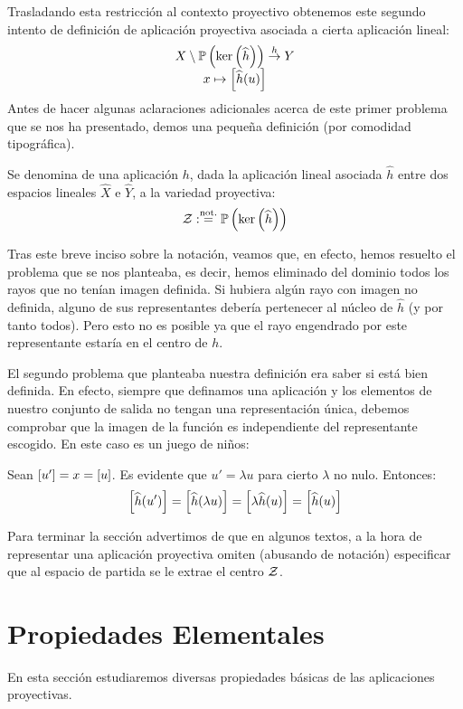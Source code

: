 Trasladando esta restricción al contexto proyectivo obtenemos este segundo intento de definición de aplicación proyectiva asociada a cierta aplicación lineal:
\[\begin{array}{c}
X\setminus\mathbb{P}\left(\ker\left(\widehat{h}\right)\right)\stackrel{h}{\to}Y\\
x\mapsto\left [ \widehat{h}(u) \right ]
\end{array}\]
Antes de hacer algunas aclaraciones adicionales acerca de este primer problema que se nos ha presentado, demos una pequeña definición (por comodidad tipográfica).
\begin{defi}[Centro]
	\label{C4_def_centro}
	Se denomina  de una aplicación $h$, dada la aplicación lineal asociada $\widehat{h}$ entre dos espacios lineales $\widehat{X}$ e $\widehat{Y}$, a la variedad proyectiva:
	\[\mathcal{Z}:\stackrel{\textrm{not.}}{=}\mathbb{P}\left(\ker\left(\widehat{h}\right)\right)\]
\end{defi}
Tras este breve inciso sobre la notación, veamos que, en efecto, hemos resuelto el problema que se nos planteaba, es decir, hemos eliminado del dominio todos los rayos que no tenían imagen definida. Si hubiera algún rayo con imagen no definida, alguno de sus representantes debería pertenecer al núcleo de $\widehat{h}$ (y por tanto todos). Pero esto no es posible ya que el rayo engendrado por este representante estaría en el centro de $h$.

El segundo problema que planteaba nuestra definición era saber si está bien definida. En efecto, siempre que definamos una aplicación y los elementos de nuestro conjunto de salida no tengan una representación única, debemos comprobar que la imagen de la función es independiente del representante escogido. En este caso es un juego de niños:

Sean $\left [ u' \right ]=x=\left [ u \right ]$. Es evidente que $u' = \lambda u$ para cierto $\lambda$ no nulo. Entonces:
\[\left [ \widehat{h}(u') \right ]=\left [ \widehat{h}(\lambda u) \right ]=\left [ \lambda\widehat{h}(u) \right ]=\left [ \widehat{h}(u) \right ]\]

Para terminar la sección advertimos de que en algunos textos, a la hora de representar una aplicación proyectiva omiten (abusando de notación) especificar que al espacio de partida se le extrae el centro $\mathcal{Z}$. 
\section{Propiedades Elementales}
En esta sección estudiaremos diversas propiedades básicas de las aplicaciones proyectivas.

